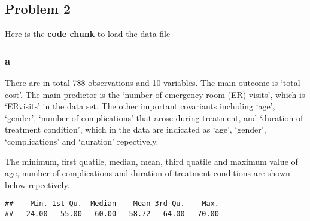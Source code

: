 \documentclass[]{article}
\newenvironment{Shaded}{\begin{snugshade}}{\end{snugshade}}
\newcommand{\KeywordTok}[1]{\textcolor[rgb]{0.13,0.29,0.53}{\textbf{#1}}}
\newcommand{\DataTypeTok}[1]{\textcolor[rgb]{0.13,0.29,0.53}{#1}}
\newcommand{\StringTok}[1]{\textcolor[rgb]{0.31,0.60,0.02}{#1}}
\newcommand{\OperatorTok}[1]{\textcolor[rgb]{0.81,0.36,0.00}{\textbf{#1}}}
\newcommand{\NormalTok}[1]{#1}
\begin{document}
\subsection{Problem 2}\label{problem-2}

Here is the \textbf{code chunk} to load the data file

\begin{Shaded}
\end{Shaded}

\subsubsection{a}\label{a-1}

There are in total 788 observations and 10 variables. The main outcome
is `total cost'. The main predictor is the `number of emergency room
(ER) visits', which is `ERvisits' in the data set. The other important
covariants including `age', `gender', `number of complications' that
arose during treatment, and `duration of treatment condition', which in
the data are indicated as `age', `gender', `complications' and
`duration' repectively.

The minimum, first quatile, median, mean, third quatile and maximum
value of age, number of complications and duration of treatment
conditions are shown below repectively.

\begin{Shaded}
\end{Shaded}

\begin{verbatim}
##    Min. 1st Qu.  Median    Mean 3rd Qu.    Max. 
##   24.00   55.00   60.00   58.72   64.00   70.00
\end{verbatim}

\begin{Shaded}
\end{Shaded}
\end{document}
